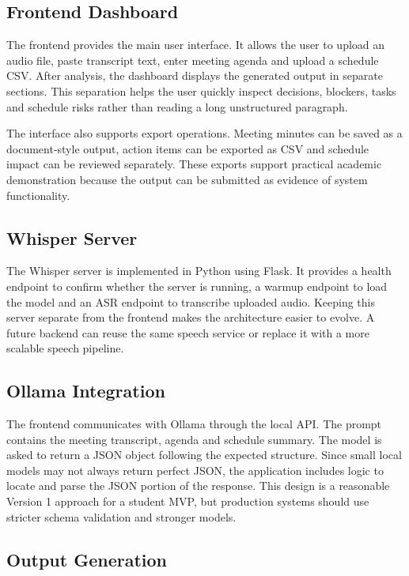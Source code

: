 \documentclass[11pt,a4paper]{article}
\begin{document}
\subsection{Frontend Dashboard}

The frontend provides the main user interface. It allows the user to upload an audio file, paste transcript text, enter meeting agenda and upload a schedule CSV. After analysis, the dashboard displays the generated output in separate sections. This separation helps the user quickly inspect decisions, blockers, tasks and schedule risks rather than reading a long unstructured paragraph.

The interface also supports export operations. Meeting minutes can be saved as a document-style output, action items can be exported as CSV and schedule impact can be reviewed separately. These exports support practical academic demonstration because the output can be submitted as evidence of system functionality.

\subsection{Whisper Server}

The Whisper server is implemented in Python using Flask. It provides a health endpoint to confirm whether the server is running, a warmup endpoint to load the model and an ASR endpoint to transcribe uploaded audio. Keeping this server separate from the frontend makes the architecture easier to evolve. A future backend can reuse the same speech service or replace it with a more scalable speech pipeline.

\subsection{Ollama Integration}

The frontend communicates with Ollama through the local API. The prompt contains the meeting transcript, agenda and schedule summary. The model is asked to return a JSON object following the expected structure. Since small local models may not always return perfect JSON, the application includes logic to locate and parse the JSON portion of the response. This design is a reasonable Version 1 approach for a student MVP, but production systems should use stricter schema validation and stronger models.

\subsection{Output Generation}
\end{document}
